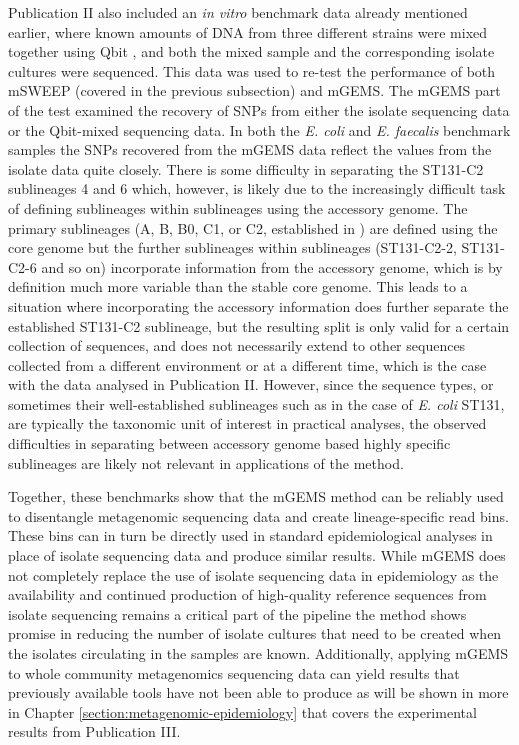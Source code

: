 \documentclass[officiallayout]{tktla}
\begin{document}
Publication II also included an \textit{in vitro} benchmark data
already mentioned earlier, where known amounts of DNA from three
different strains were mixed together using Qbit
\citep{maklin_bacterial_2021}, and both the mixed sample and the
corresponding isolate cultures were sequenced. This data was used to
re-test the performance of both mSWEEP (covered in the previous
subsection) and mGEMS. The mGEMS part of the test examined the
recovery of SNPs from either the isolate sequencing data or the
Qbit-mixed sequencing data. In both the \textit{E. coli} and
\textit{E. faecalis} benchmark samples the SNPs recovered from the
mGEMS data reflect the values from the isolate data quite
closely. There is some difficulty in separating the ST131-C2
sublineages 4 and 6 which, however, is likely due to the increasingly
difficult task of defining sublineages within sublineages using the
accessory genome. The primary sublineages (A, B, B0, C1, or C2,
established in \citep{kallonen2017systematic}) are defined using the
core genome but the further sublineages within sublineages
(ST131-C2-2, ST131-C2-6 and so on) incorporate information from the
accessory genome, which is by definition much more variable than the
stable core genome. This leads to a situation where incorporating the
accessory information does further separate the established ST131-C2
sublineage, but the resulting split is only valid for a certain
collection of sequences, and does not necessarily extend to other
sequences collected from a different environment or at a different
time, which is the case with the data analysed in Publication
II. However, since the sequence types, or sometimes their
well-established sublineages such as in the case of \textit{E. coli}
ST131, are typically the taxonomic unit of interest in practical
analyses, the observed difficulties in separating between accessory
genome based highly specific sublineages are likely not relevant in
applications of the method.

Together, these benchmarks show that the mGEMS method can be reliably
used to disentangle metagenomic sequencing data and create
lineage-specific read bins. These bins can in turn be directly used in
standard epidemiological analyses in place of isolate sequencing data
and produce similar results. While mGEMS does not completely replace
the use of isolate sequencing data in epidemiology \textemdash{ } as
the availability and continued production of high-quality reference
sequences from isolate sequencing remains a critical part of the
pipeline \textemdash{ } the method shows promise in reducing the
number of isolate cultures that need to be created when the isolates
circulating in the samples are known. Additionally, applying mGEMS to
whole community metagenomics sequencing data can yield results that previously
available tools have not been able to produce as will be shown in more
in Chapter \ref{section:metagenomic-epidemiology} that covers the
experimental results from Publication III.
\end{document}
